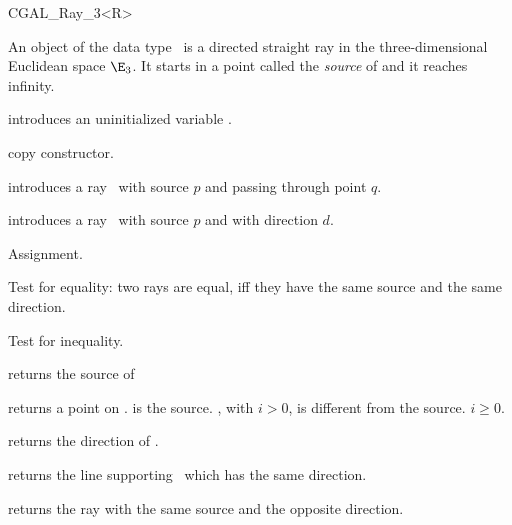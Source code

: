 
\begin {classtemplate} {CGAL_Ray_3<R>}

An object  of the data type \classname\ is a directed
straight ray in the three-dimensional Euclidean space $\E_3$. It starts
in a  point called the {\em source} of   and it reaches infinity.


\creation
{}


\hidden {}
             {introduces an uninitialized variable \var.}

\hidden {}
 	    {copy constructor.}

            {introduces a ray \var\ 
             with source $p$ and passing through point $q$.}

            {introduces a ray \var\ with source $p$ and with 
             direction $d$.}

\operations
\threecolumns{5cm}{4cm}

\hidden {}
        {Assignment.}

       {Test for equality: two rays are equal, iff they have the same 
        source and the same direction.}

       {Test for inequality.}



       {returns the source of \var}

       {returns a point on \var.  is the source.
        \CCstyle{point(i)}, with $i>0$, is different from the 
        source. \precond $i \geq 0$.}

       {returns the direction of \var.}

       {returns the line supporting \var\ which has the same direction.}

       {returns the ray with the same source and the opposite direction.}


\end{classtemplate}
